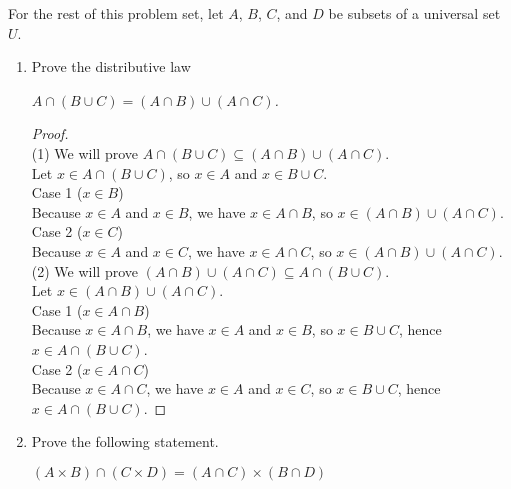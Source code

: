 \documentclass[12pt]{amsart}
\begin{document}
\newpage
\noindent
For the rest of this problem set, let $A$, $B$, $C$, and $D$ be subsets of a universal set $U$.

\vspace{0.2in}
\begin{enumerate}[{\bfseries 1.}]
\addtocounter{enumi}{4}
\item Prove the distributive law

	\vspace{0.1in}
	\begin{center}
	\noindent
	\textit{$A\cap (B\cup C)=(A\cap B)\cup (A\cap C)$.}
	\end{center}
\begin{normalize}
\begin{proof}
\vspace{0.1in}
\\ (1) We will prove $A\cap (B\cup C) \subseteq (A\cap B)\cup (A\cap C)$.
\\ Let $x \in A\cap (B\cup C)$, so $x \in A$ and $x\in B\cup C$.
\\ Case 1 ($x\in B$)
\\ Because $x \in A$ and $x \in B$, we have $x \in A\cap B$, so $x \in (A\cap B)\cup (A\cap C)$.
\\ Case 2 ($x \in C$)
\\ Because $x \in A$ and $x \in C$, we have $x \in A\cap C$, so $x \in (A\cap B)\cup (A\cap C)$.
\\ (2) We will prove $(A\cap B)\cup (A\cap C) \subseteq A\cap (B\cup C)$.
\\ Let $x \in (A\cap B)\cup (A\cap C)$.
\\ Case 1 ($x\in A\cap B$)
\\ Because $x\in A\cap B$, we have $x\in A$ and $x\in B$, so $x\in B\cup C$, hence $x\in A\cap (B\cup C)$.
\\ Case 2 ($x\in A\cap C$)
\\ Because $x\in A\cap C$, we have $x\in A$ and $x\in C$, so $x\in B\cup C$, hence $x\in A\cap (B\cup C)$.
\end{proof}
\end{normalize}

\newpage
\item Prove the following statement.

	\vspace{0.1in}
	\begin{center}
	\noindent
	\textit{$(A\times B)\cap (C\times D)=(A\cap C)\times (B\cap D)$}
	\end{center}
	

\end{enumerate}
\end{document}
